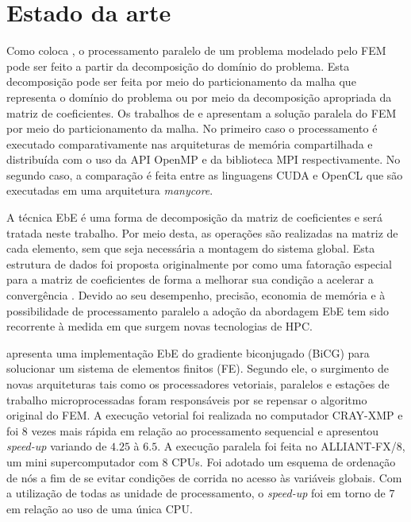 \documentclass[
    12pt,               %
    openright,          %
    oneside,
    a4paper,            %
    english,            %
    french,             %
    spanish,            %
    brazil              %
    ]{abntex2}
\begin{document}
\chapter{Estado da arte}
Como coloca , o processamento paralelo de um problema modelado pelo FEM pode ser feito a partir da decomposição do domínio do problema. Esta decomposição pode ser feita por meio do particionamento da malha que representa o domínio do problema ou por meio da decomposição apropriada da matriz de coeficientes.
Os trabalhos de  e  apresentam a solução paralela do FEM por meio do particionamento da malha. No primeiro caso o processamento é executado comparativamente nas arquiteturas de memória compartilhada e distribuída com o uso da API OpenMP e da biblioteca MPI respectivamente.
No segundo caso, a comparação é feita entre as linguagens CUDA e OpenCL que são executadas em uma arquitetura \textit{manycore}. 

A técnica EbE é uma forma de decomposição da matriz de coeficientes e será tratada neste trabalho. Por meio desta, as operações são realizadas na matriz de cada elemento, sem que seja necessária a montagem do sistema global. Esta estrutura de dados foi proposta originalmente por  como uma fatoração especial para a matriz de coeficientes de forma a melhorar sua condição a acelerar a convergência \cite{Carey1988}. Devido ao seu desempenho, precisão, economia de memória e à possibilidade de processamento paralelo \cite{Levit1987, Jing2008, Kiss2012} a adoção da abordagem EbE tem sido recorrente à medida em que surgem novas tecnologias de HPC. 

 apresenta uma implementação EbE do gradiente biconjugado (BiCG) para solucionar um sistema de elementos finitos (FE). Segundo ele, o surgimento de novas arquiteturas tais como os processadores vetoriais, paralelos e estações de trabalho microprocessadas foram responsáveis por se repensar o algoritmo original do FEM. A execução vetorial foi realizada no computador CRAY-XMP e foi $8$ vezes mais rápida em relação ao processamento sequencial e apresentou \textit{speed-up} variando de $4.25$ à $6.5$. A execução paralela foi feita no ALLIANT-FX/8, um mini supercomputador com $8$ CPUs. Foi adotado um esquema de ordenação de nós a fim de se evitar condições de corrida no acesso às variáveis globais. Com a utilização de todas as unidade de processamento, o \textit{speed-up} foi em torno de $7$ em relação ao uso de uma única CPU. 
\end{document}
